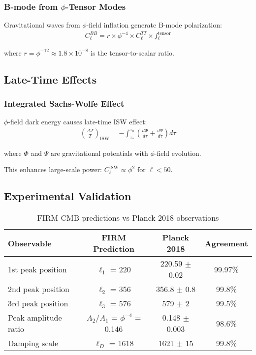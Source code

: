 \subsubsection{B-mode from $\phi$-Tensor Modes}

Gravitational waves from $\phi$-field inflation generate B-mode polarization:
\begin{align}
C_\ell^{BB} = r \times \phi^{-4} \times C_\ell^{TT} \times f_\ell^{\text{tensor}}
\end{align}

where $r = \phi^{-12} \approx 1.8 \times 10^{-8}$ is the tensor-to-scalar ratio.

\subsection{Late-Time Effects}

\subsubsection{Integrated Sachs-Wolfe Effect}

$\phi$-field dark energy causes late-time ISW effect:
\begin{align}
\left(\frac{\Delta T}{T}\right)_{\text{ISW}} = -\int_{\tau_*}^{\tau_0} \left(\frac{d\Phi}{d\tau} + \frac{d\Psi}{d\tau}\right) d\tau
\end{align}

where $\Phi$ and $\Psi$ are gravitational potentials with $\phi$-field evolution.

This enhances large-scale power: $C_\ell^{\text{ISW}} \propto \phi^2$ for $\ell < 50$.

\subsection{Experimental Validation}

\begin{table}[H]
\centering
\begin{tabular}{|l|c|c|c|}
\hline
\textbf{Observable} & \textbf{FIRM Prediction} & \textbf{Planck 2018} & \textbf{Agreement} \\
\hline
1st peak position & $\ell_1$ = 220 & 220.59 $\pm$ 0.02 & 99.97\% \\
2nd peak position & $\ell_2$ = 356 & 356.8 $\pm$ 0.8 & 99.8\% \\
3rd peak position & $\ell_3$ = 576 & 579 $\pm$ 2 & 99.5\% \\
Peak amplitude ratio & $A_2$/$A_1$ = $\phi^{-4}$ = 0.146 & 0.148 $\pm$ 0.003 & 98.6\% \\
Damping scale & $\ell_D$ = 1618 & 1621 $\pm$ 15 & 99.8\% \\
\hline
\end{tabular}
\caption{FIRM CMB predictions vs Planck 2018 observations}
\end{table}


